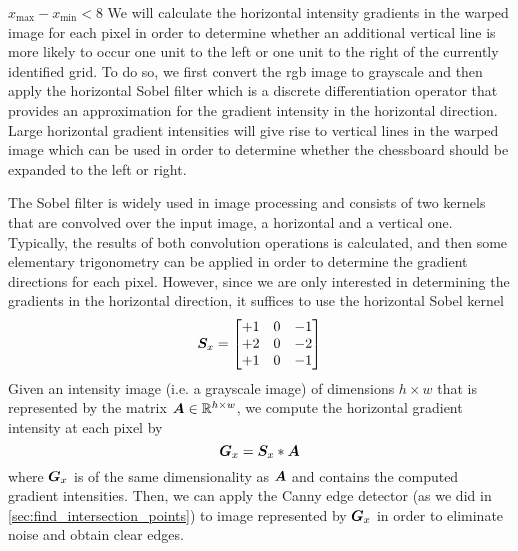 \documentclass[../main.tex]{subfiles}
\begin{document}
\begin{caselist}
\begin{case}{$x_\text{max}-x_\text{min}<8$}
        We will calculate the horizontal intensity gradients in the warped image for each pixel in order to determine whether an additional vertical line is more likely to occur one unit to the left or one unit to the right of the currently identified grid.
        To do so, we first convert the \gls{rgb} image to grayscale and then apply the horizontal Sobel filter which is a discrete differentiation operator that provides an approximation for the gradient intensity in the horizontal direction.
        Large horizontal gradient intensities will give rise to vertical lines in the warped image which can be used in order to determine whether the chessboard should be expanded to the left or right.

        The Sobel filter is widely used in image processing and consists of two kernels that are convolved over the input image, a horizontal and a vertical one.
        Typically, the results of both convolution operations is calculated, and then some elementary trigonometry can be applied in order to determine the gradient directions for each pixel.
        However, since we are only interested in determining the gradients in the horizontal direction, it suffices to use the horizontal Sobel kernel
        \begin{equation}
            {\bm{S}}_x = \begin{bmatrix}
                \label{eq:sobel_kernel_horizontal}
                +1 & 0 & -1\\
                +2 & 0 & -2\\
                +1 & 0 & -1
            \end{bmatrix}
        \end{equation}
        Given an intensity image (i.e. a grayscale image) of dimensions $h \times w$ that is represented by the matrix ${\bm{A}} \in \mathbb{R}^{h\times w}$, 
        we compute the horizontal gradient intensity at each pixel by
        \begin{equation}
            \label{eq:sobel_operation_horizontal}
            {\bm{G}}_x = {\bm{S}}_x * {\bm{A}}
        \end{equation}
        where ${\bm{G}}_x$ is of the same dimensionality as ${\bm{A}}$ and contains the computed gradient intensities.
        Then, we can apply the Canny edge detector (as we did in \cref{sec:find_intersection_points}) to image represented by ${\bm{G}}_x$ in order to eliminate noise and obtain clear edges. 
        \begin{figure}
            \centering
            \begin{subfigure}[t]{0.48\textwidth}

\end{subfigure}
\end{figure}
\end{case}
\end{caselist}
\end{document}
